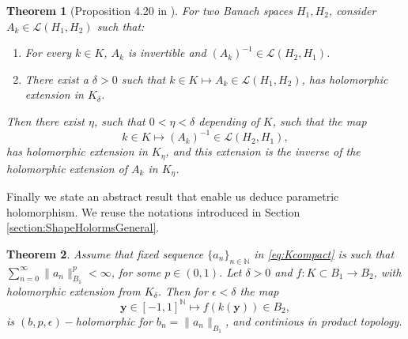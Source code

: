 \documentclass{article}
\newtheorem{theorem}{Theorem}[section]
\newcommand{\IN}{{\mathbb N}}
\newcommand{\by}{\bm{y}}
\begin{document}
\begin{theorem}[Proposition 4.20 in \cite{Henriquez2021}]
\label{thrm:abtractinverse}For two Banach spaces $H_1,H_2$,
consider $A_k \in \mathcal{L}(H_1,H_2)$ such that: 
\begin{enumerate}
\item 
For every $k \in K$, $A_k$ is invertible and $(A_k)^{-1} \in \mathcal{L}(H_2,H_1)$. 
\item 
There exist a $\delta >0$ such that $k \in K \mapsto A_k \in \mathcal{L}(H_1,H_2)$, has holomorphic extension in $K_\delta$.
\end{enumerate}
Then there exist $\eta$, such that $0<\eta<\delta$ depending of $K$, such that the map 
$$k \in K \mapsto (A_{k})^{-1} \in \mathcal{L}(H_2,H_1),$$ has holomorphic extension in $K_\eta$, and this extension is the inverse of the holomorphic extension of $A_k$ in $K_\eta$.
\end{theorem} 
Finally we state an abstract result that enable us deduce parametric holomorphism. We reuse the notations introduced in Section \ref{section:ShapeHolormsGeneral}.
\begin{theorem}
\label{theorem:generalbpeholomrfsm}
Assume that fixed sequence $\{a_n\}_{n \in \IN}$ in \eqref{eq:Kcompact} is  such that $\sum_{n=0}^\infty \| a_n \|^p_{B_1} <\infty$, for some $p \in (0,1)$. 
Let $\delta>0$ and $f : K \subset B_1 \rightarrow B_2$, with holomorphic extension from $K_\delta$. Then for $\epsilon < \delta$ the map 
$$ \by \in [-1,1]^{\IN} \mapsto f(k(\by)) \in B_2,$$
is $(b,p,\epsilon)-$holomorphic for $b_n = \|a_n\|_{B_1}$, and continious in product topology.
\end{theorem}
\end{document}

